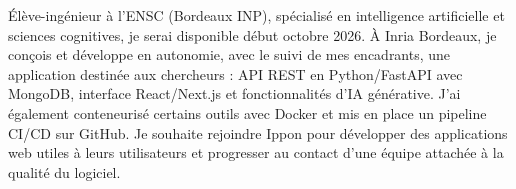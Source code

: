 
\begin{cvparagraph}
Élève-ingénieur à l’ENSC (Bordeaux INP), spécialisé en intelligence artificielle et sciences cognitives, je serai disponible début octobre 2026. À Inria Bordeaux, je conçois et développe en autonomie, avec le suivi de mes encadrants, une application destinée aux chercheurs : API REST en Python/FastAPI avec MongoDB, interface React/Next.js et fonctionnalités d’IA générative. J’ai également conteneurisé certains outils avec Docker et mis en place un pipeline CI/CD sur GitHub. Je souhaite rejoindre Ippon pour développer des applications web utiles à leurs utilisateurs et progresser au contact d’une équipe attachée à la qualité du logiciel.
\end{cvparagraph}
